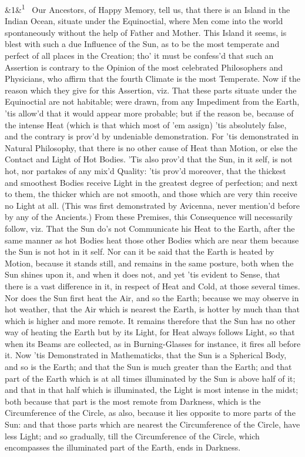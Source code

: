 \documentclass[12pt]{article}
\newcommand{\para}[1][]{\par\noindent\ifx&#1&\else\textsuperscript{\footnotesize #1}~\fi}
\begin{document}
\para[1] Our Ancestors, of Happy Memory, tell us, that there is an Island in the Indian Ocean, situate under the Equinoctial, where Men come into the world spontaneously without the help of Father and Mother. This Island it seems, is blest with such a due Influence of the Sun, as to be the most temperate and perfect of all places in the Creation; tho' it must be confess'd that such an Assertion is contrary to the Opinion of the most celebrated Philosophers and Physicians, who affirm that the fourth Climate is the most Temperate. Now if the reason which they give for this Assertion, viz. That these parts situate under the Equinoctial are not habitable; were drawn, from any Impediment from the Earth, 'tis allow'd that it would appear more probable; but if the reason be, because of the intense Heat (which is that which most of 'em assign) 'tis absolutely false, and the contrary is prov'd by undeniable demonstration. For 'tis demonstrated in Natural Philosophy, that there is no other cause of Heat than Motion, or else the Contact and Light of Hot Bodies. 'Tis also prov'd that the Sun, in it self, is not hot, nor partakes of any mix'd Quality: 'tis prov'd moreover, that the thickest and smoothest Bodies receive Light in the greatest degree of perfection; and next to them, the thicker which are not smooth, and those which are very thin receive no Light at all. (This was first demonstrated by Avicenna, never mention'd before by any of the Ancients.) From these Premises, this Consequence will necessarily follow, viz. That the Sun do's not Communicate his Heat to the Earth, after the same manner as hot Bodies heat those other Bodies which are near them because the Sun is not hot in it self. Nor can it be said that the Earth is heated by Motion, because it stands still, and remains in the same posture, both when the Sun shines upon it, and when it does not, and yet 'tis evident to Sense, that there is a vast difference in it, in respect of Heat and Cold, at those several times. Nor does the Sun first heat the Air, and so the Earth; because we may observe in hot weather, that the Air which is nearest the Earth, is hotter by much than that which is higher and more remote. It remains therefore that the Sun has no other way of heating the Earth but by its Light, for Heat always follows Light, so that when its Beams are collected, as in Burning-Glasses for instance, it fires all before it. Now 'tis Demonstrated in Mathematicks, that the Sun is a Spherical Body, and so is the Earth; and that the Sun is much greater than the Earth; and that part of the Earth which is at all times illuminated by the Sun is above half of it; and that in that half which is illuminated, the Light is most intense in the midst; both because that part is the most remote from Darkness, which is the Circumference of the Circle, as also, because it lies opposite to more parts of the Sun: and that those parts which are nearest the Circumference of the Circle, have less Light; and so gradually, till the Circumference of the Circle, which encompasses the illuminated part of the Earth, ends in Darkness.
\end{document}
